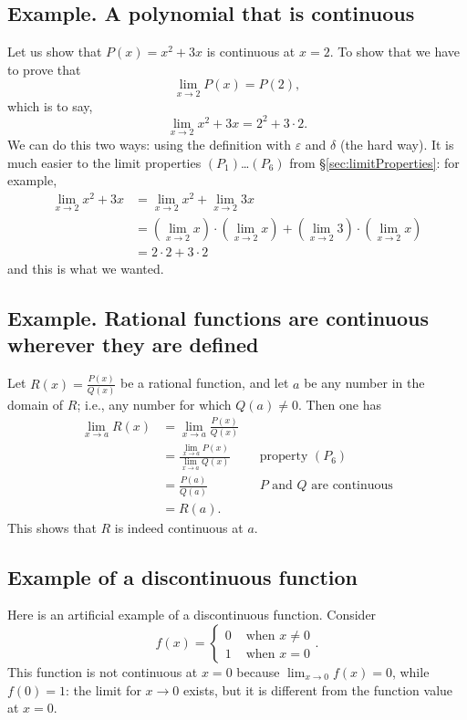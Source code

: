 \subsection{Example.  A polynomial that is continuous} 
Let us show that $P(x) = x^2+3x$ is continuous at $x=2$.  To
show that we have to prove that
\[
\lim_{x\to 2} P(x) = P(2),
\]
which is to say,
\[
\lim_{x\to 2}x^2+3x = 2^2+3\cdot 2.
\]
We can do this two ways: using the definition with $\varepsilon$ and
$\delta$ (the hard way).  It is much easier to the limit properties
$(P_1)$\ldots $(P_6)$ from \S\ref{sec:limitProperties}: for example,
\begin{align*}
  \lim_{x\to 2}x^2+3x &= \lim_{x\to 2}x^2 + \lim_{x\to 2} 3x \\
  &= (\lim_{x\to 2}x )\cdot (\lim_{x\to 2}x ) + (\lim_{x\to 2}3)\cdot (\lim_{x\to 2}x)\\
  &= 2 \cdot 2 + 3 \cdot 2
\end{align*}
and this is what we wanted.
  
\subsection{Example.  Rational functions are continuous wherever they are defined} 

Let $R(x) = \frac{P(x)}{Q(x)}$ be a rational function, and let $a$ be any
number in the domain of $R$; i.e., any number for which $Q(a)\neq0$.  Then
one has
\begin{align*}
  \lim_{x\to a}R(x)
  &= \lim_{x\to a}\frac{P(x)}{Q(x)} && \\
  &= \frac{\lim_{x\to a} P(x)}{\lim_{x\to a}Q(x)}
  && \text{property }(P_6)\\
  &= \frac{P(a)}{Q(a)} && \text{$P$ and $Q$ are continuous}\\
  &= R(a).
\end{align*}
This shows that $R$ is indeed continuous at $a$.

\subsection{Example of a discontinuous function} 
Here is an artificial example of a discontinuous function.  Consider  
\[
f(x) =
\begin{cases}
  0 & \text{ when } x\neq0 \\
  1 & \text{ when } x=0
\end{cases}.
\]%
%
This function is not continuous at $x=0$ because $\lim_{x\to0} f(x) =
0$, while $f(0) = 1$: the limit for $x\to0$ exists, but it is
different from the function value at $x=0$.

